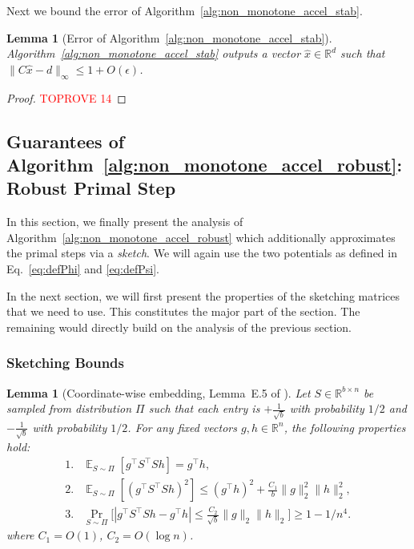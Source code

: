 \documentclass[11pt]{article}
\newtheorem{lemma}[theorem]{Lemma}
\newcommand\dd{\boldsymbol{\mathit{d}}}
\renewcommand\gg{\boldsymbol{\mathit{g}}}
\newcommand\hh{\boldsymbol{\mathit{h}}}
\newcommand\xx{\boldsymbol{\mathit{x}}}
\newcommand\CC{\boldsymbol{\mathit{C}}}
\renewcommand\SS{\boldsymbol{\mathit{S}}}
\newcommand\xxhat{\widehat{\xx}}
\newcommand\R{\mathbb{R}}
\DeclareMathOperator*{\E}{{\mathbb{E}}}
\begin{document}
Next we bound the error of Algorithm~\ref{alg:non_monotone_accel_stab}.
\begin{lemma}[Error of Algorithm~\ref{alg:non_monotone_accel_stab}]\label{lem:error_non_monotone_acc_stab}
Algorithm~\ref{alg:non_monotone_accel_stab} outputs a vector $\xxhat \in \R^d$ such that $\|\CC \xxhat - \dd\|_{\infty} \leq 1 + O(\epsilon)$.
\end{lemma}
\begin{proof}\textcolor{red}{TOPROVE 14}\end{proof}


 
\subsection{Guarantees of Algorithm~\ref{alg:non_monotone_accel_robust}: Robust Primal Step}\label{sec:NonMonRob}

In this section, we finally present the analysis of Algorithm~\ref{alg:non_monotone_accel_robust} which additionally approximates the primal steps via a {\it sketch}. We will again use the two potentials as defined in Eq.~\eqref{eq:defPhi} and \eqref{eq:defPsi}.




In the next section, we will first present the properties of the sketching matrices that we need to use. This constitutes the major part of the section. The remaining would directly build on the analysis of the previous section.

\subsubsection{Sketching Bounds}
\begin{lemma}[Coordinate-wise embedding, Lemma~E.5 of \cite{lsz19}]\label{lem:CE_one_sketch}
Let $\SS \in \R^{b \times n}$ be sampled from distribution $\Pi$ such that each entry is $+\frac{1}{\sqrt{b}}$ with probability $1/2$ and $-\frac{1}{\sqrt{b}}$ with probability $1/2$.
For any fixed vectors $\gg, \hh\in \R^n$, the following properties hold:
\begin{align*}
1. & \E_{\SS \sim \Pi}[ \gg^{\top} \SS^\top \SS \hh ] = \gg^{\top} \hh, \\
2. & \E_{\SS \sim \Pi}[ (\gg^{\top} \SS^\top \SS \hh )^2 ] \leq (\gg^{\top} \hh)^2 + \frac{C_1}{b} \|\gg\|_2^2 \| \hh \|_2^2, \\
3. & \Pr_{\SS \sim \Pi}\Big[ | \gg^{\top} \SS^\top \SS \hh - \gg^{\top} \hh | \leq \frac{ C_2 }{ \sqrt{b} } \|\gg\|_2 \| \hh \|_2 \Big] \geq 1 - 1 / n^4.
\end{align*}
where $C_1 = O(1)$, $C_2 = O(\log n)$.
\end{lemma}
\end{document}
